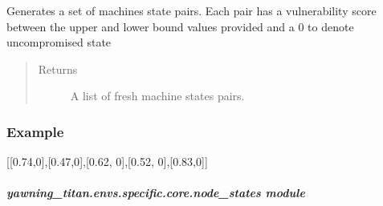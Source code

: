 \documentclass[letterpaper,10pt,english]{sphinxmanual}
\begin{document}
\begin{fulllineitems}
\begin{fulllineitems}
\label{\detokenize{source/yawning_titan.envs.specific.core:yawning_titan.envs.specific.core.machines.Machines.init_machines}}
\sphinxAtStartPar
Generates a set of machines state pairs.
Each pair has a vulnerability score between the
upper and lower bound values provided and a 0
to denote uncompromised state
\begin{quote}\begin{description}
\item[{Returns}] \leavevmode
\sphinxAtStartPar
A list of fresh machine states pairs.

\end{description}\end{quote}
\subsubsection*{Example}

\sphinxAtStartPar
{[}{[}0.74,0{]},{[}0.47,0{]},{[}0.62, 0{]},{[}0.52, 0{]},{[}0.83,0{]}{]}

\end{fulllineitems}


\end{fulllineitems}



\subparagraph{yawning\_titan.envs.specific.core.node\_states module}
\label{\detokenize{source/yawning_titan.envs.specific.core:module-yawning_titan.envs.specific.core.node_states}}\label{\detokenize{source/yawning_titan.envs.specific.core:yawning-titan-envs-specific-core-node-states-module}}
\end{document}
